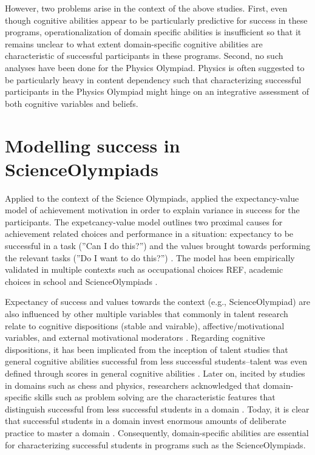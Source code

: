 \documentclass[]{interact}
\begin{document}
However, two problems arise in the context of the above studies. First, even though cognitive abilities appear to be particularly predictive for success in these programs, operationalization of domain specific abilities is insufficient so that it remains unclear to what extent domain-specific cognitive abilities are characteristic of successful participants in these programs. Second, no such analyses have been done for the Physics Olympiad. Physics is often suggested to be particularly heavy in content dependency such that characterizing successful participants in the Physics Olympiad might hinge on an integrative assessment of both cognitive variables and beliefs.


\section{Modelling success in ScienceOlympiads}

Applied to the context of the Science Olympiads, \cite{Urhahne.2012} applied the expectancy-value model of achievement motivation in order to explain variance in success for the participants. The expetcancy-value model outlines two proximal causes for achievement related choices and performance in a situation: expectancy to be successful in a task (''Can I do this?'') and the values brought towards performing the relevant tasks (''Do I want to do this?'') \citep{Eccles.1983}. The model has been empirically validated in multiple contexts such as occupational choices REF, academic choices in school \citep{Koller.2000} and ScienceOlympiads \citep{Urhahne.2012}. 

Expectancy of success and values towards the context (e.g., ScienceOlympiad) are also influenced by other multiple variables that commonly in talent research relate to cognitive dispositions (stable and vairable), affective/motivational variables, and external motivational moderators \citep[e.g.,][]{Ziegler.2009,Heller.2002}. Regarding cognitive dispositions, it has been implicated from the inception of talent studies that general cognitive abilities successful from less successful students--talent was even defined through scores in general cognitive abilities \citep{Rost.2010}. Later on, incited by studies in domains such as chess and physics, researchers acknowledged that domain-specific skills such as problem solving are the characteristic features that distinguish successful from less successful students in a domain \citep{Chi.1981}. Today, it is clear that successful students in a domain invest enormous amounts of deliberate practice to master a domain \citep{Simon.1983}. Consequently, domain-specific abilities are essential for characterizing successful students in programs such as the ScienceOlympiads. 
\end{document}

